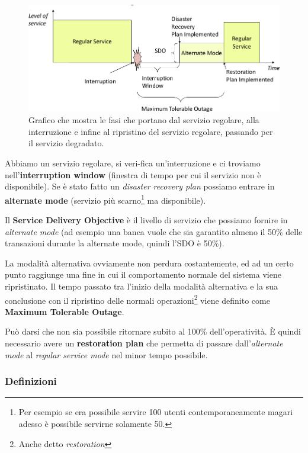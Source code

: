 \begin{figure}[h!]
        \begin{center}
                \includegraphics[scale=0.65]{res/img/recovery-times.png}
        \end{center}
        \caption{Grafico che mostra le fasi che portano dal servizio 
        regolare, alla interruzione e infine al ripristino del servizio 
        regolare, passando per il servizio degradato.}
\end{figure}
Abbiamo un servizio regolare, si veri-fica un'interruzione e ci troviamo
nell'\textbf{interruption window} (finestra di tempo per cui il servizio non è
disponibile). Se è stato fatto un \textit{disaster recovery plan}
possiamo entrare in \textbf{alternate mode} (servizio più scarno\footnote{Per
esempio se era possibile servire 100 utenti contemporaneamente magari adesso
\`e possibile servirne solamente 50.} ma disponibile).

Il \textbf{Service Delivery Objective} è il livello di servizio che possiamo
fornire in \textit{alternate mode} (ad esempio una banca vuole che sia
garantito almeno il 50\% delle transazioni durante la alternate mode, quindi
l'SDO è 50\%).

La modalità alternativa ovviamente non perdura costantemente, ed ad un certo
punto raggiunge una fine in cui il comportamento normale del sistema viene
ripristinato. Il tempo passato tra l'inizio della modalità alternativa e la
sua conclusione con il ripristino delle normali operazioni\footnote{Anche
detto \textit{restoration}} viene definito come \textbf{Maximum Tolerable
Outage}.

Può darsi che non sia possibile ritornare subito al 100\% dell'operatività.
È quindi necessario avere un \textbf{restoration plan} che permetta di passare
dall'\textit{alternate mode} al \textit{regular service mode} nel minor tempo
possibile.

\subsubsection{Definizioni}

